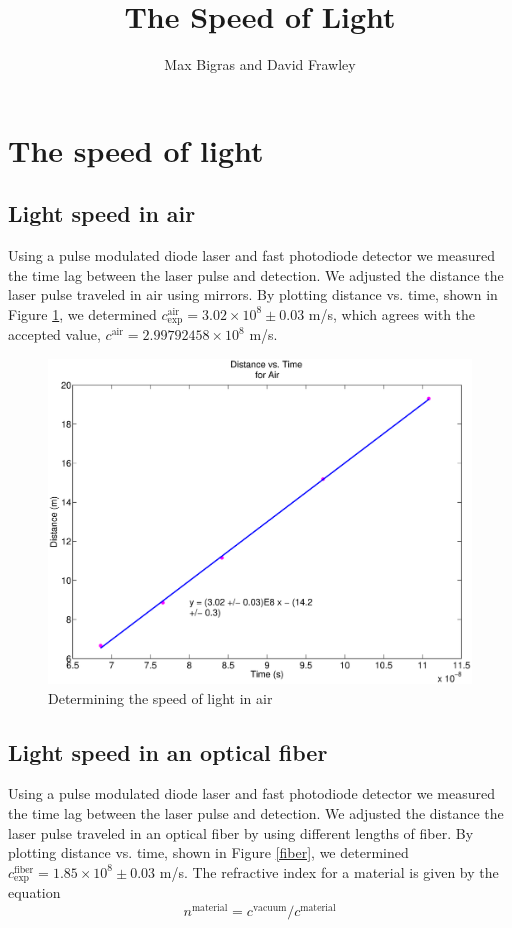 
\title{The Speed of Light}
\author{Max Bigras and David Frawley}



\maketitle

\section{The speed of light}
\subsection{Light speed in air}
Using a pulse modulated diode laser and fast photodiode detector we measured the time lag between the laser pulse and detection. We adjusted the distance the laser pulse traveled in air using mirrors. By plotting distance vs. time, shown in Figure \ref{air}, we determined $c^{\mathrm{air}}_{\mathrm{exp}} = 3.02 \times 10^{8} \pm 0.03 $ m/s, which agrees with the accepted value, $c^{\mathrm{air}} = 2.99792458 \times 10^{8}$ m/s.
\begin{figure}[H]
  \includegraphics[totalheight=0.6\textwidth]{figs/air_final}
  \caption{Determining the speed of light in air}
  \label{air}
\end{figure}

\subsection{Light speed in an optical fiber}
Using a pulse modulated diode laser and fast photodiode detector we measured the time lag between the laser pulse and detection. We adjusted the distance the laser pulse traveled in an optical fiber by using different lengths of fiber. By plotting distance vs. time, shown in Figure \ref{fiber}, we determined $c^{\mathrm{fiber}}_{\mathrm{exp}} = 1.85 \times 10^{8} \pm 0.03 $ m/s. The refractive index for a material is given by the equation
\begin{equation}
n^{\mathrm{material}} = c^{\mathrm{vacuum}}/c^{\mathrm{material}}
\label{n}
\end{equation}

